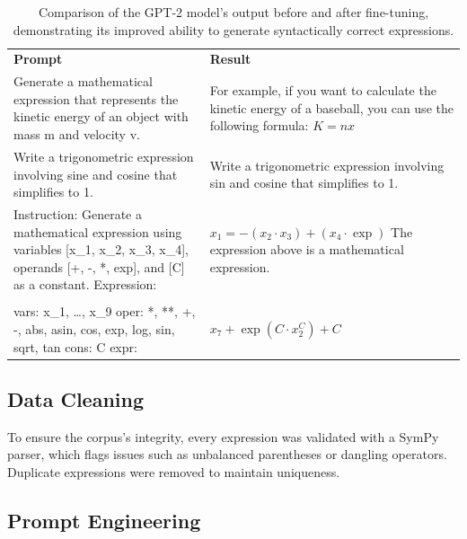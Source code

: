 \begin{table}[htbp]
    \centering
    \caption{Comparison of the GPT-2 model's output before and after fine-tuning, demonstrating its improved ability to generate syntactically correct expressions.}
    \label{tab:gpt2-comparison}
    \ttfamily
    \begin{tabularx}{\textwidth}{ >{\RaggedRight}X >{\RaggedRight}X }
    \toprule
    \multicolumn{2}{c}{\textbf{Base Model}} \\
    \midrule
    \textbf{Prompt} & \textbf{Result} \\
    \midrule
    Generate a mathematical expression that represents the kinetic energy of an object with mass m and velocity v.
    &
    For example, if you want to calculate the kinetic energy of a baseball, you can use the following formula: $K=nx$ \\
    \addlinespace
    Write a trigonometric expression involving sine and cosine that simplifies to 1.
    &
    Write a trigonometric expression involving sin and cosine that simplifies to 1. \\
    \addlinespace
    Instruction: Generate a mathematical expression using variables [x\_1, x\_2, x\_3, x\_4], operands [+, -, *, exp], and [C] as a constant. Expression:
    &
    $x_1 = -(x_2 \cdot x_3) + (x_4 \cdot \exp)$ The expression above is a mathematical expression. \\
    \midrule[1pt]
    \multicolumn{2}{c}{\textbf{After Fine-Tuning}} \\
    \midrule
    vars: x\_1, \ldots, x\_9 \newline oper: *, **, +, -, abs, asin, cos, exp, log, sin, sqrt, tan \newline cons: C \newline expr:
    &
    $x_7 + \exp(C \cdot x_2^C) + C$ \\
    \bottomrule
    \end{tabularx}
\end{table}

\subsection{Data Cleaning}

To ensure the corpus's integrity, every expression was validated with a SymPy \cite{sympy} parser, which flags issues such as unbalanced parentheses or dangling operators. Duplicate expressions were removed to maintain uniqueness.

\subsection{Prompt Engineering}
\label{sec:prompt_engineering}

